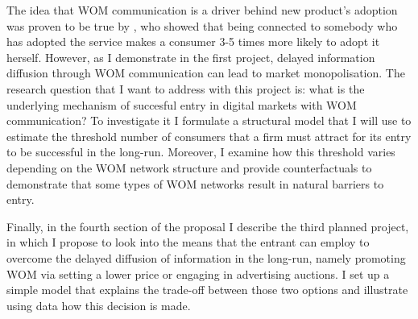 \documentclass{article}
\numberwithin{figure}{section}
\numberwithin{table}{section}
\theoremstyle{indented}
\numberwithin{equation}{section} %
\begin{document}
The idea that WOM communication is a driver behind new product's adoption was proven to be true by \citet{Hill2006}, who showed that being connected to somebody who has adopted the service makes a consumer 3-5 times more likely to adopt it herself. However, as I demonstrate in the first project, delayed information diffusion through WOM communication can lead to market monopolisation. The research question that I want to address with this project is: what is the underlying mechanism of succesful entry in digital markets with WOM communication? To investigate it I formulate a structural model that I will use to estimate the threshold number of consumers that a firm must attract for its entry to be successful in the long-run. Moreover, I examine how this threshold varies depending on the WOM network structure and provide counterfactuals to demonstrate that some types of WOM networks result in natural barriers to entry. 

Finally, in the fourth section of the proposal I describe the third planned project, in which I propose to look into the means that the entrant can employ to overcome the delayed diffusion of information in the long-run, namely promoting WOM via setting a lower price or engaging in advertising auctions. I set up a simple model that explains the trade-off between those two options and illustrate using data how this decision is made. 




\end{document}
